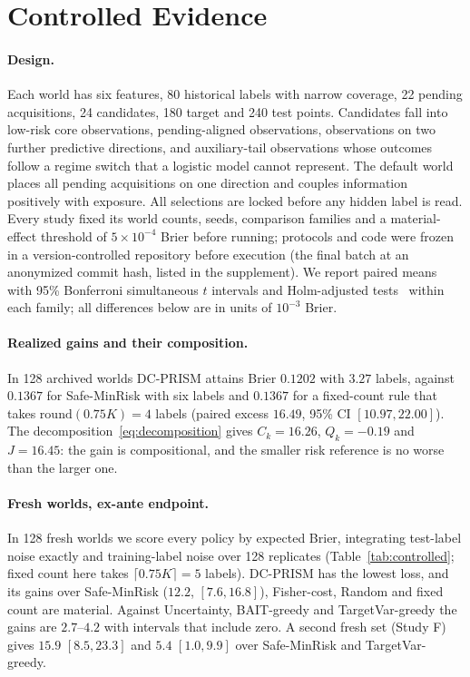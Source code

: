 \documentclass[runningheads]{llncs}
\begin{document}
\section{Controlled Evidence}
\label{sec:controlled}
\paragraph{Design.} Each world has six features, 80 historical labels with narrow coverage, 22 pending acquisitions, 24 candidates, 180 target and 240 test points. Candidates fall into low-risk core observations, pending-aligned observations, observations on two further predictive directions, and auxiliary-tail observations whose outcomes follow a regime switch that a logistic model cannot represent. The default world places all pending acquisitions on one direction and couples information positively with exposure. All selections are locked before any hidden label is read. Every study fixed its world counts, seeds, comparison families and a material-effect threshold of $5\times10^{-4}$ Brier before running; protocols and code were frozen in a version-controlled repository before execution (the final batch at an anonymized commit hash, listed in the supplement). We report paired means with 95\% Bonferroni simultaneous $t$ intervals and Holm-adjusted tests~\cite{holm1979simple} within each family; all differences below are in units of $10^{-3}$ Brier.

\paragraph{Realized gains and their composition.} In 128 archived worlds DC-PRISM attains Brier $0.1202$ with $3.27$ labels, against $0.1367$ for Safe-MinRisk with six labels and $0.1367$ for a fixed-count rule that takes $\mathrm{round}(0.75K)=4$ labels (paired excess $16.49$, 95\% CI $[10.97,22.00]$). The decomposition~\eqref{eq:decomposition} gives $C_k=16.26$, $Q_k=-0.19$ and $J=16.45$: the gain is compositional, and the smaller risk reference is no worse than the larger one.

\paragraph{Fresh worlds, ex-ante endpoint.} In 128 fresh worlds we score every policy by expected Brier, integrating test-label noise exactly and training-label noise over 128 replicates (Table~\ref{tab:controlled}; fixed count here takes $\lceil0.75K\rceil=5$ labels). DC-PRISM has the lowest loss, and its gains over Safe-MinRisk ($12.2$, $[7.6,16.8]$), Fisher-cost, Random and fixed count are material. Against Uncertainty, BAIT-greedy and TargetVar-greedy the gains are $2.7$--$4.2$ with intervals that include zero. A second fresh set (Study F) gives $15.9$ $[8.5,23.3]$ and $5.4$ $[1.0,9.9]$ over Safe-MinRisk and TargetVar-greedy.
\end{document}

